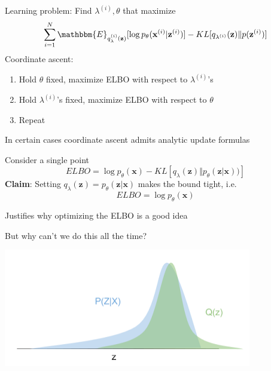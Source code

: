 \documentclass{beamer}
\let\tempone\itemize
\let\temptwo\enditemize
\renewenvironment{itemize}{\tempone\addtolength{\itemsep}{0.5\baselineskip}}{\temptwo}
\newcommand{\zvec}{\mathbf{z}}
\newcommand{\E}{\mathbbm{E}}
\newcommand{\xvec}{\mathbf{x}}
\begin{document}
\begin{frame}
  \begin{center}
   \end{center}   
   Learning problem: Find $\lambda^{(i)}, \theta$ that maximize 
\[ \sum_{i=1}^N \E_{q_\lambda^{(i)}(\zvec)}[\log  p_\theta(\xvec^{(i)} | \zvec^{(i)}) ] - KL[q_{\lambda^{(i)}}(\zvec) \Vert p(\zvec^{(i)})] \]
Coordinate ascent:
\begin{enumerate}
\item Hold $\theta$ fixed, maximize ELBO with respect to $\lambda^{(i)}$'s
\item Hold $\lambda^{(i)}$'s fixed, maximize ELBO with respect to $\theta$
\item Repeat
\end{enumerate}
In certain cases coordinate ascent admits analytic update formulas
\end{frame}

\begin{frame}
  \begin{center}
   \end{center}   
       Consider a single point
  \[ ELBO = \log p_\theta(\xvec)- KL[ q_\lambda(\zvec) \Vert p_\theta(\zvec | \xvec)) ]  \]
   \textbf{Claim}: Setting $q_\lambda(\zvec) = p_\theta(\zvec | \xvec)$ makes the bound tight, i.e.
     \[ ELBO = \log p_\theta(\xvec)  \]
     \begin{itemize}
  \item Justifies why optimizing the ELBO is a good idea
  \item But why can't we do this all the time?
  \end{itemize}
  \end{frame}
  
  \begin{frame}
  \begin{center}
   \end{center}   
   \center
\includegraphics[scale=0.7]{img/vi-gauss}
 \end{frame}
\end{document}
